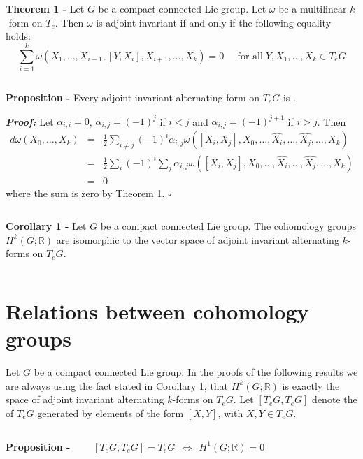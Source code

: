 \documentclass[12pt]{article}
\begin{document}
$\,$

{\bf Theorem 1 -} Let $G$ be a compact connected Lie group. Let $\omega$ be a multilinear $k$-form on $T_e$. Then $\omega$ is adjoint invariant if and only if the following equality holds:
\begin{displaymath}
\sum_{i=1}^k \omega(X_1, \dots, X_{i-1}, [Y,X_i],X_{i+1},\dots,X_k)=0 \;\;\;\;\; \text{for all}\; Y, X_1, \dots, X_k \in T_eG
\end{displaymath}

$\,$

{\bf Proposition -} Every adjoint invariant alternating form on $T_eG$ is .

{\bf \emph{Proof:}} Let $\alpha_{i,i}=0$, $\alpha_{i,j}=(-1)^j$ if $i <j$ and $\alpha_{i,j} = (-1)^{j+1}$ if $i > j$. Then
\begin{eqnarray*}
d\omega (X_0, \dots , X_k) & = & \frac{1}{2} \sum_{i \neq j} (-1)^i \alpha_{i,j} \omega([X_i, X_j], X_0, \dots, \hat{X_i}, \dots, \hat{X_j}, \dots, X_k)\\
& = & \frac{1}{2} \sum_i (-1)^i \sum_j \alpha_{i,j} \omega([X_i, X_j], X_0, \dots, \hat{X_i}, \dots, \hat{X_j}, \dots, X_k)\\
& = & 0 \,
\end{eqnarray*}
where the  sum is zero by Theorem 1. $\square$

$\,$

{\bf Corollary 1 -} Let $G$ be a compact connected Lie group. The cohomology groups $H^k(G;\mathbb{R})$ are isomorphic to the vector space of adjoint invariant alternating $k$-forms on $T_eG$.

$\,$

\section{Relations between cohomology groups}

Let $G$ be a compact connected Lie group. In the proofs of the following results we are always using the fact stated in Corollary 1, that $H^k(G;\mathbb{R})$ is exactly the space of adjoint invariant alternating $k$-forms on $T_eG$. Let $[T_eG, T_eG]$ denote the  of $T_eG$ generated by elements of the form $[X,Y]$, with $X, Y \in T_eG$.

$\;$

{\bf Proposition -} $\qquad [T_eG, T_eG] = T_eG \;\, \Longleftrightarrow \;\, H^1(G;\mathbb{R})=0$
\end{document}
